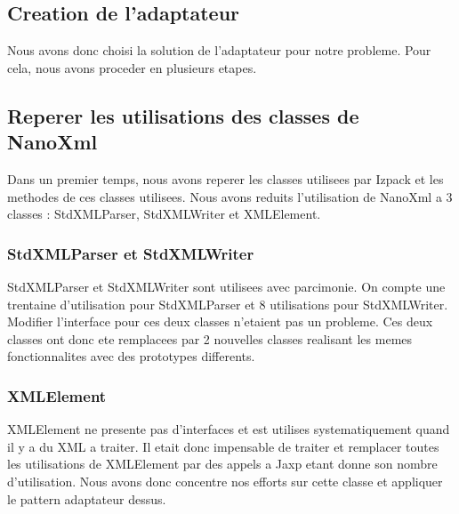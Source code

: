 \subsection{Creation de l'adaptateur}
Nous avons donc choisi la solution de l'adaptateur pour notre probleme. Pour cela, nous avons proceder en plusieurs etapes.
\subsection{Reperer les utilisations des classes de NanoXml}
Dans un premier temps, nous avons reperer les classes utilisees par Izpack et les methodes de ces classes utilisees. Nous avons reduits l'utilisation de NanoXml a 3 classes : StdXMLParser, StdXMLWriter et XMLElement.
\subsubsection{StdXMLParser et StdXMLWriter}
StdXMLParser et StdXMLWriter sont utilisees avec parcimonie. On compte une trentaine d'utilisation pour StdXMLParser et 8 utilisations pour StdXMLWriter. Modifier l'interface pour ces deux classes n'etaient pas un probleme. Ces deux classes ont donc ete remplacees par 2 nouvelles classes realisant les memes fonctionnalites avec des prototypes differents.
\subsubsection{XMLElement}
XMLElement ne presente pas d'interfaces et est utilises systematiquement quand il y a du XML a traiter. Il etait donc impensable de traiter et remplacer toutes les utilisations de XMLElement par des appels a Jaxp etant donne son nombre d'utilisation. Nous avons donc concentre nos efforts sur cette classe et appliquer le pattern adaptateur dessus.

